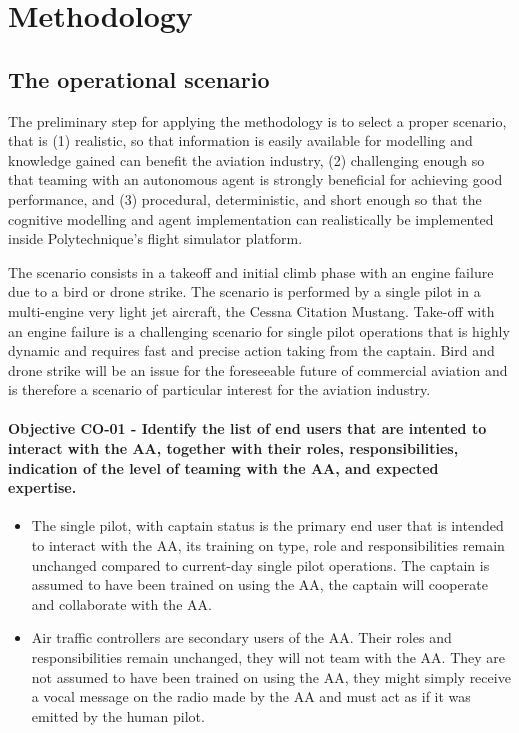 \documentclass[12pt,a4paper]{article} %
\begin{document}
	\section{Methodology} 

	\subsection{The operational scenario}
	The preliminary step for applying the methodology is to select a proper scenario, that is (1) realistic, so that information is easily available for modelling and knowledge gained can benefit the aviation industry, (2) challenging enough so that teaming with an autonomous agent is strongly beneficial for achieving good performance, and (3) procedural, deterministic, and short enough so that the cognitive modelling and agent implementation can realistically be implemented inside Polytechnique's flight simulator platform.
	
	The scenario consists in a takeoff and initial climb phase with an engine failure due to a bird or drone strike. The scenario is performed by a single pilot in a multi-engine very light jet aircraft, the Cessna Citation Mustang. Take-off with an engine failure is a challenging scenario for single pilot operations that is highly dynamic and requires fast and precise action taking from the captain. Bird and drone strike will be an issue for the foreseeable future of commercial aviation and is therefore a scenario of particular interest for the aviation industry.

	\paragraph{Objective CO-01 - Identify the list of end users that are intented to interact with the AA, together with their roles, responsibilities, indication of the level of teaming with the AA, and expected expertise.}
	\begin{itemize}
		\item The single pilot, with captain status is the primary end user that is intended to interact with the AA, its training on type, role and responsibilities remain unchanged compared to current-day single pilot operations. The captain is assumed to have been trained on using the AA, the captain will cooperate and collaborate with the AA.
		\item Air traffic controllers are secondary users of the AA. Their roles and responsibilities remain unchanged, they will not team with the AA. They are not assumed to have been trained on using the AA, they might simply receive a vocal message on the radio made by the AA and must act as if it was emitted by the human pilot. 
	\end{itemize}
	
\end{document}
